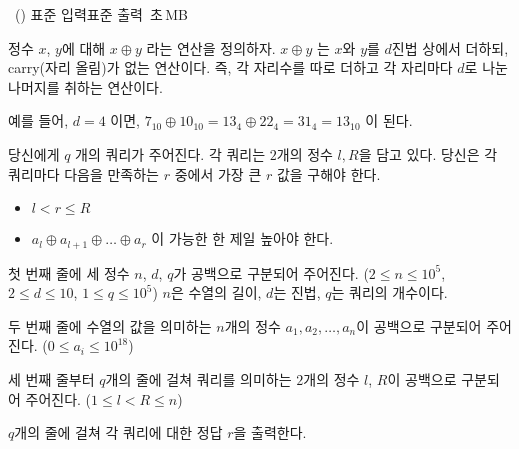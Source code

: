 \begin{problem}{\kcpcprobnocarry\ (\kcpcprobnocarryshort)}
    {표준 입력}{표준 출력}
    {\kcpcprobnocarrytime\,초}{\kcpcprobnocarrymemory\,MB}{}
    
    정수 $x$, $y$에 대해 $x \oplus y$ 라는 연산을 정의하자. $x \oplus y$ 는 $x$와 $y$를 $d$진법 상에서 더하되, carry(자리 올림)가 없는 연산이다. 즉, 각 자리수를 따로 더하고 각 자리마다 $d$로 나눈 나머지를 취하는 연산이다.
    
    예를 들어, $d=4$ 이면, $7_{10} \oplus 10_{10} = 13_{4} \oplus 22_{4} = 31_{4} = 13_{10}$ 이 된다.
    
    당신에게 $q$ 개의 쿼리가 주어진다. 각 쿼리는 $2$개의 정수 $l, R$을 담고 있다. 당신은 각 쿼리마다 다음을 만족하는 $r$ 중에서 가장 큰 $r$ 값을 구해야 한다.
    
    \begin{itemize}
    \item $l < r \le R$
    \item $a_{l} \oplus a_{l+1} \oplus \ldots \oplus a_{r}$ 이 가능한 한 제일 높아야 한다.
    \end{itemize}
    
    
    \InputFile
    첫 번째 줄에 세 정수 $n$, $d$, $q$가 공백으로 구분되어 주어진다. ($2 \le n \le 10^5$, $2 \le d \le 10$, $1 \le q \le 10^5$) $n$은 수열의 길이, $d$는 진법, $q$는 쿼리의 개수이다.
    
    두 번째 줄에 수열의 값을 의미하는 $n$개의 정수 $a_{1}, a_{2}, \ldots, a_{n}$이 공백으로 구분되어 주어진다. ($0 \le a_{i} \le 10^{18}$)
    
    세 번째 줄부터 $q$개의 줄에 걸쳐 쿼리를 의미하는 $2$개의 정수 $l$, $R$이 공백으로 구분되어 주어진다. ($1 \le l < R \le n$)
    
    \OutputFile
    $q$개의 줄에 걸쳐 각 쿼리에 대한 정답 $r$을 출력한다.
    
    \Examples
    \begin{example}
    \end{example}
\end{problem}

